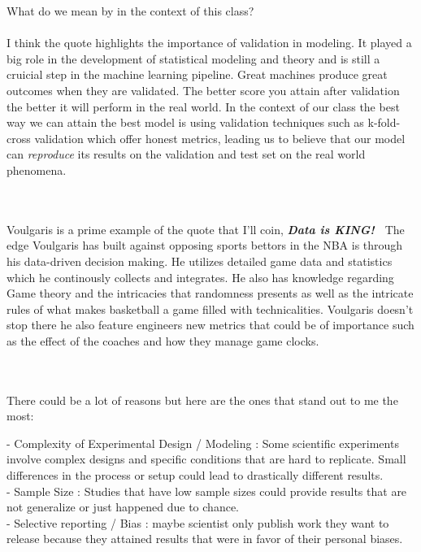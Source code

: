 \documentclass[12pt]{article}
\begin{document}
\begin{enumerate}
{What do we mean by  in the context of this class?} \\\\
I think the quote highlights the importance of validation in modeling. It played a big role in the development of statistical modeling and theory and is still a cruicial step in the machine learning pipeline. Great machines produce great outcomes when they are validated. The better score you attain after validation the better it will perform in the real world. In the context of our class the best way we can attain the best model is using validation techniques such as k-fold-cross validation which offer honest metrics, leading us to believe that our model can \textit{reproduce} its results on the validation and test set on the real world phenomena.


\spc \\ \\ 
Voulgaris is a prime example of the quote that I'll coin, \textbf{\textit{Data is KING!~}} The edge Voulgaris has built against opposing sports bettors in the NBA is through his data-driven decision making. He utilizes detailed game data and statistics which he continously collects and integrates. He also has knowledge regarding Game theory and the intricacies that randomness presents as well as the intricate rules of what makes basketball a game filled with technicalities. Voulgaris doesn't stop there he also feature engineers new metrics that could be of importance such as the effect of the coaches and how they manage game clocks. 



 \\ \\ 
There could be a lot of reasons but here are the ones that stand out to me the most:

- Complexity of Experimental Design / Modeling : Some scientific experiments involve complex designs and specific conditions that are hard to replicate. Small differences in the process or setup could lead to drastically different results. \\ 
- Sample Size : Studies that have low sample sizes could provide results that are not generalize or just happened due to chance. \\ 
- Selective reporting / Bias : maybe scientist only publish work they want to release because they attained results that were in favor of their personal biases. 



\end{enumerate}
\end{document}
